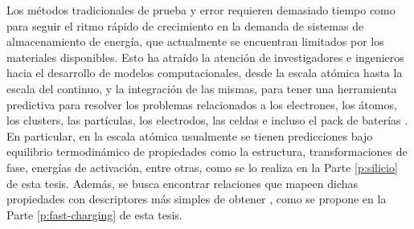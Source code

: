 Los métodos tradicionales de prueba y error requieren demasiado tiempo como 
para seguir el ritmo rápido de crecimiento en la demanda de sistemas de 
almacenamiento de energía, que actualmente se encuentran limitados por los
materiales disponibles. Esto ha atraído la atención de investigadores e ingenieros 
hacia el desarrollo de modelos computacionales, desde la escala atómica hasta la 
escala del continuo, y la integración de las mismas, para tener una herramienta 
predictiva para resolver los problemas relacionados a los electrones, los átomos, 
los clusters, las partículas, los electrodos, las celdas e incluso el pack de 
baterías \cite{shi2016}. En particular, en la escala atómica usualmente se tienen
predicciones bajo equilibrio termodinámico de propiedades como la estructura, 
transformaciones de fase, energías de activación, entre otras, como se lo realiza
en la Parte \ref{p:silicio} de esta tesis. Además, se busca encontrar relaciones 
que mapeen dichas propiedades con descriptores más simples de obtener 
\cite{juan2021}, como se propone en la Parte \ref{p:fast-charging} de esta tesis.
